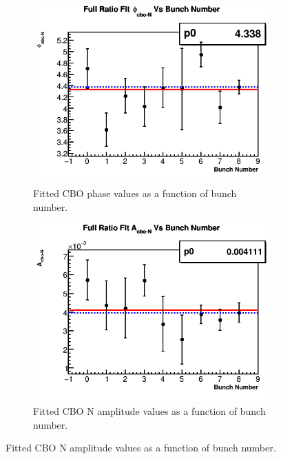 \begin{figure}[]
\begin{subfigure}[t]{0.4\textwidth}
		    \end{subfigure}%
			\vspace{4mm}
		    \begin{subfigure}[t]{0.4\textwidth}
			    \centering
				\includegraphics[width=\textwidth]{RatioCBO_phi_cbo-N_Vs_BunchNum_Canv}
			    \caption{Fitted CBO phase values as a function of bunch number.}
		    \end{subfigure}
		    \hspace{4mm}
		    \begin{subfigure}[t]{0.4\textwidth}
			    \centering
				\includegraphics[width=\textwidth]{RatioCBO_A_cbo-N_Vs_BunchNum_Canv}
			    \caption{Fitted CBO N amplitude values as a function of bunch number.}

\end{subfigure}
\end{figure}
